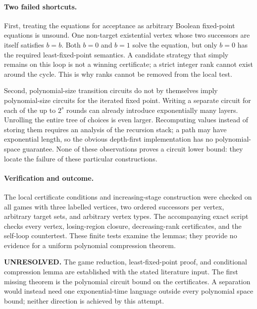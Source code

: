 \documentclass[11pt]{article}
\begin{document}
\paragraph{Two failed shortcuts.}
First, treating the equations for acceptance as arbitrary Boolean fixed-point equations is unsound. One non-target existential vertex whose two successors are itself satisfies $b=b$. Both $b=0$ and $b=1$ solve the equation, but only $b=0$ has the required least-fixed-point semantics. A candidate strategy that simply remains on this loop is not a winning certificate; a strict integer rank cannot exist around the cycle. This is why ranks cannot be removed from the local test.

Second, polynomial-size transition circuits do not by themselves imply polynomial-size circuits for the iterated fixed point. Writing a separate circuit for each of the up to $2^s$ rounds can already introduce exponentially many layers. Unrolling the entire tree of choices is even larger. Recomputing values instead of storing them requires an analysis of the recursion stack; a path may have exponential length, so the obvious depth-first implementation has no polynomial-space guarantee. None of these observations proves a circuit lower bound: they locate the failure of these particular constructions.

\paragraph{Verification and outcome.}
The local certificate conditions and increasing-stage construction were checked on all games with three labelled vertices, two ordered successors per vertex, arbitrary target sets, and arbitrary vertex types. The accompanying exact script checks every vertex, losing-region closure, decreasing-rank certificates, and the self-loop countertest. These finite tests examine the lemmas; they provide no evidence for a uniform polynomial compression theorem.

\textbf{UNRESOLVED.} The game reduction, least-fixed-point proof, and conditional compression lemma are established with the stated literature input. The first missing theorem is the polynomial circuit bound on the certificates. A separation would instead need one exponential-time language outside every polynomial space bound; neither direction is achieved by this attempt.
\end{document}
